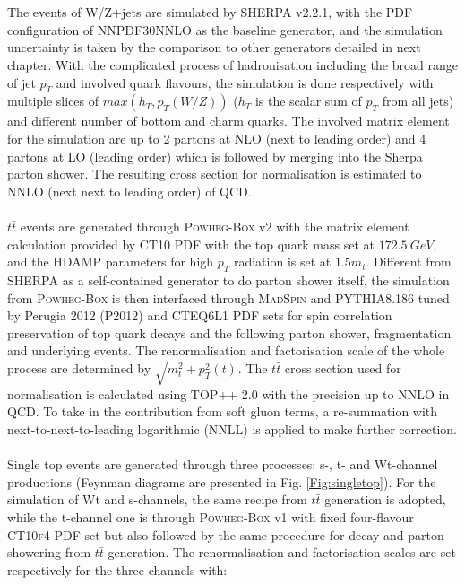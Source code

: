 \\
\\The events of W/Z+jets are simulated by \textsc{SHERPA} v2.2.1\cite{sherpa22_twiki}, with the PDF configuration of \textsc{NNPDF30NNLO}\cite{Ball:2012cx} as the baseline generator, and the simulation uncertainty is taken by the comparison to other generators detailed in next chapter. With the complicated process of hadronisation including the broad range of jet $p_{T}$ and involved quark flavours, the simulation is done respectively with multiple slices of $max(h_{T}, p_{T}(W/Z))$ ($h_{T}$ is the scalar sum of $p_{T}$ from all jets) and different number of bottom and charm quarks. The involved matrix element for the simulation are up to 2 partons at NLO (next to leading order) and 4 partons at LO (leading order) which is followed by merging into the Sherpa parton shower. The resulting cross section for normalisation is estimated to NNLO (next next to leading order) of QCD.
\\
\\$t\bar{t}$ events are generated through \textsc{Powheg-Box}\cite{Alioli:2010xd} v2 with the matrix element calculation provided by \textsc{CT10 PDF}\cite{Gao:2013xoa} with the top quark mass set at $172.5~GeV$, and the \textsc{HDAMP} parameters for high $p_{T}$ radiation is set at $1.5m_{t}$. Different from \textsc{SHERPA} as a self-contained generator to do parton shower itself, the simulation from \textsc{Powheg-Box} is then interfaced through \textsc{MadSpin}\cite{Artoisenet:2012st} and \textsc{PYTHIA}8.186 tuned by Perugia 2012 (P2012)\cite{mc11ctunes} and \textsc{CTEQ6L1 PDF}\cite{Stump:2003yu} sets for spin correlation preservation of top quark decays and the following parton shower, fragmentation and underlying events. The renormalisation and factorisation scale of the whole process are determined by $\sqrt{m_{t}^2+p^2_{T}(t)}$. The $t\bar{t}$ cross section used for normalisation is calculated using \textsc{TOP++} 2.0\cite{Czakon:2013goa} with the precision up to NNLO in QCD. To take in the contribution from soft gluon terms, a re-summation with next-to-next-to-leading logarithmic (NNLL) is applied to make further correction.  
\\
\\Single top events are generated through three processes: s-, t- and Wt-channel productions (Feynman diagrams are presented in Fig. \ref{Fig:singletop}). For the simulation of Wt and s-channels, the same recipe from $t\bar{t}$ generation is adopted, while the t-channel one is through \textsc{Powheg-Box} v1 with fixed four-flavour \textsc{CT10f4 PDF}\cite{Lai:2010vv} set but also followed by the same procedure for decay and parton showering from $t\bar{t}$ generation. The renormalisation and factorisation scales are set respectively for the three channels with:
